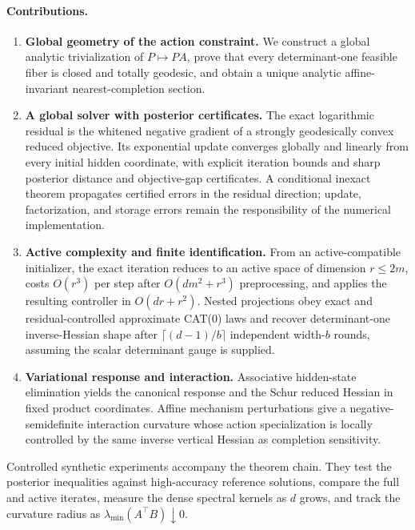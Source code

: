 \paragraph{Contributions.}
\begin{enumerate}[leftmargin=*,itemsep=0.2em]
  \item \textbf{Global geometry of the action constraint.}
  We construct a global analytic trivialization of \(P\mapsto PA\), prove that
  every determinant-one feasible fiber is closed and totally geodesic, and
  obtain a unique analytic affine-invariant nearest-completion section.

  \item \textbf{A global solver with posterior certificates.}
  The exact logarithmic residual is the whitened negative gradient of a
  strongly geodesically convex reduced objective.  Its exponential update
  converges globally and linearly from every initial hidden coordinate, with
  explicit iteration bounds and sharp posterior distance and objective-gap
  certificates.  A conditional inexact theorem propagates certified errors in
  the residual direction; update, factorization, and storage errors remain the
  responsibility of the numerical implementation.

  \item \textbf{Active complexity and finite identification.}
  From an active-compatible initializer, the exact iteration reduces to an
  active space of dimension \(r\le2m\), costs \(O(r^3)\) per step after
  \(O(dm^2+r^3)\) preprocessing, and applies the resulting controller in
  \(O(dr+r^2)\).  Nested projections obey exact and residual-controlled
  approximate CAT(0) laws and recover determinant-one inverse-Hessian shape
  after \(\lceil(d-1)/b\rceil\) independent width-\(b\) rounds, assuming the
  scalar determinant gauge is supplied.

  \item \textbf{Variational response and interaction.}
  Associative hidden-state elimination yields the canonical response and the
  Schur reduced Hessian in fixed product coordinates.  Affine mechanism
  perturbations give a
  negative-semidefinite interaction curvature whose action specialization is
  locally controlled by the same inverse vertical Hessian as completion
  sensitivity.
\end{enumerate}

Controlled synthetic experiments accompany the theorem chain.  They test the
posterior inequalities against high-accuracy reference solutions, compare the
full and active iterates, measure the dense spectral kernels as \(d\) grows,
and track the curvature radius as \(\lambda_{\min}(A^\top B)\downarrow0\).

